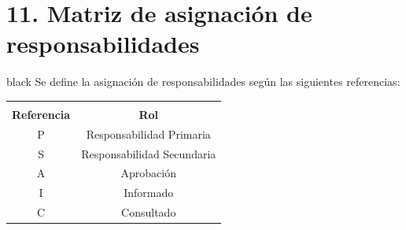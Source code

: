 \documentclass[11pt]{charter}
\begin{document}
\section{11. Matriz de asignación de responsabilidades}
\label{sec:responsabilidades}
\begin{consigna}{black}
Se define la asignación de responsabilidades según las siguientes referencias:

\begin{table}[H]
\footnotesize
\setlength\arrayrulewidth{1pt}
\begin{tabular}{|c|c|}
\hline
\cellcolor[HTML]{CBCEFB}                                      & \cellcolor[HTML]{CBCEFB}                               \\
\multirow{-2}{*}{\cellcolor[HTML]{CBCEFB}\textbf{Referencia}} & \multirow{-2}{*}{\cellcolor[HTML]{CBCEFB}\textbf{Rol}} \\ \hline
P                                                             & Responsabilidad Primaria                               \\ \hline
S                                                             & Responsabilidad Secundaria                             \\ \hline
A                                                             & Aprobación                                             \\ \hline
I                                                             & Informado                                              \\ \hline
C                                                             & Consultado                                             \\ \hline
\end{tabular}
\end{table}



\end{consigna}
\end{document}
